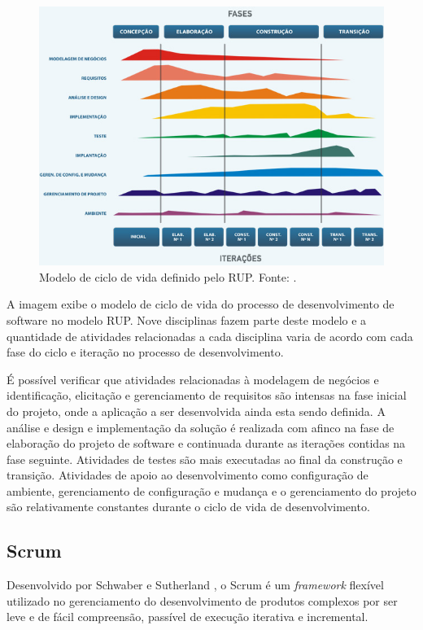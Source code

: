 \begin{figure}[htb]
\centering
\includegraphics[scale=0.8]{figuras/ciclo_rup.jpg}
\caption{Modelo de ciclo de vida definido pelo RUP. Fonte: \cite{henrique_rup_2015}.}
\label{ciclo_rup}
\end{figure}

A imagem exibe o modelo de ciclo de vida do processo de desenvolvimento de software no modelo RUP. Nove disciplinas fazem parte deste modelo e a quantidade de atividades relacionadas a cada disciplina varia de acordo com cada fase do ciclo e iteração no processo de desenvolvimento.

É possível verificar que atividades relacionadas à modelagem de negócios e identificação, elicitação e gerenciamento de requisitos são intensas na fase inicial do projeto, onde a aplicação a ser desenvolvida ainda esta sendo definida. A análise e design e implementação da solução é realizada com afinco na fase de elaboração do projeto de software e continuada durante  as iterações contidas na fase seguinte. Atividades de testes são mais executadas ao final da construção e transição. Atividades de apoio ao desenvolvimento como configuração de ambiente, gerenciamento de configuração e mudança e o gerenciamento do projeto são relativamente constantes durante o ciclo de vida de desenvolvimento.

\subsection{Scrum}
Desenvolvido por Schwaber e Sutherland \cite{schwaber_guia_2013}, o Scrum é um \textit{framework} flexível utilizado no gerenciamento do desenvolvimento de produtos complexos por ser leve e de fácil compreensão, passível de execução iterativa e incremental.

